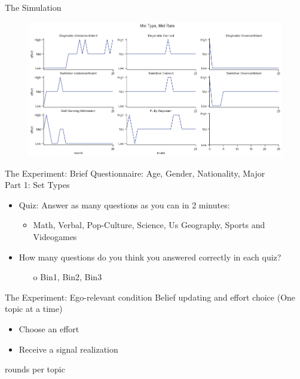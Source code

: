 \documentclass[aspectratio=169]{beamer}
\begin{document}
\begin{frame}{The Simulation}
\label{Figure2}
    \begin{figure}
    \centering
    \includegraphics[scale=0.43]{figures/all_1_1.png}
\end{figure}     

\hyperlink{WorstCase}{} 

\end{frame}


\begin{frame}{The Experiment:}
Brief Questionnaire: Age, Gender, Nationality, Major\\
\bigskip
Part 1: Set Types\\
\bigskip
\begin{itemize}
    \item Quiz: Answer as many questions as you can in 2 minutes:\\
    \begin{itemize}
        \item Math, Verbal, Pop-Culture, Science, Us Geography, Sports and Videogames\\
    \end{itemize}
    \bigskip
    \item How many questions do you think you answered correctly in each quiz?\\
    \begin{itemize}
        \item[o] Bin1, Bin2, Bin3
    \end{itemize}
\end{itemize}

\end{frame}


\begin{frame}{The Experiment: Ego-relevant condition}
Belief updating and effort choice (One topic at a time)\\
\bigskip
\begin{itemize}
    \item Choose an effort
    \item Receive a signal realization
\end{itemize}
 rounds per topic

\end{frame}
\end{document}
